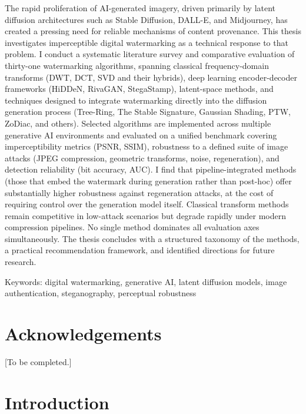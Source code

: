 ﻿\documentclass[12pt, a4paper, twoside]{report}
\numberwithin{equation}{chapter}
\begin{document}
The rapid proliferation of AI-generated imagery, driven primarily by latent diffusion architectures such as Stable Diffusion, DALL-E, and Midjourney, has created a pressing need for reliable mechanisms of content provenance. This thesis investigates imperceptible digital watermarking as a technical response to that problem. I conduct a systematic literature survey and comparative evaluation of thirty-one watermarking algorithms, spanning classical frequency-domain transforms (DWT, DCT, SVD and their hybrids), deep learning encoder-decoder frameworks (HiDDeN, RivaGAN, StegaStamp), latent-space methods, and techniques designed to integrate watermarking directly into the diffusion generation process (Tree-Ring, The Stable Signature, Gaussian Shading, PTW, ZoDiac, and others). Selected algorithms are implemented across multiple generative AI environments and evaluated on a unified benchmark covering imperceptibility metrics (PSNR, SSIM), robustness to a defined suite of image attacks (JPEG compression, geometric transforms, noise, regeneration), and detection reliability (bit accuracy, AUC). I find that pipeline-integrated methods (those that embed the watermark during generation rather than post-hoc) offer substantially higher robustness against regeneration attacks, at the cost of requiring control over the generation model itself. Classical transform methods remain competitive in low-attack scenarios but degrade rapidly under modern compression pipelines. No single method dominates all evaluation axes simultaneously. The thesis concludes with a structured taxonomy of the methods, a practical recommendation framework, and identified directions for future research.

  \begin{flushleft}
    Keywords: digital watermarking, generative AI, latent diffusion models, image authentication, steganography, perceptual robustness
    \end{flushleft}
\chapter*{Acknowledgements}

[To be completed.]

\tableofcontents
\listoffigures
\listoftables

\clearpage
{}

\chapter{Introduction}
\end{document}
